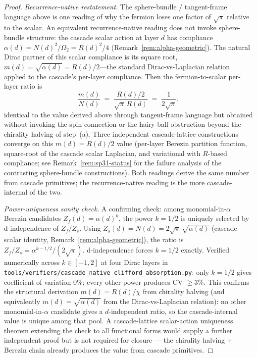 \documentclass[12pt,a4paper]{article}
\begin{document}
\begin{proof}
\medskip
\noindent\emph{Recurrence-native restatement.}
The sphere-bundle / tangent-frame language above is one reading of why the fermion
loses one factor of $\sqrt{\pi}$ relative to the scalar.  An equivalent
recurrence-native reading does not invoke sphere-bundle structure:
the cascade scalar action at layer $d$ has compliance
$\alpha(d) = N(d)^2/\Omega_2 = R(d)^2/4$ (Remark~\ref{rem:alpha-geometric}).  The
natural Dirac partner of this scalar compliance is its square root,
$m(d) = \sqrt{\alpha(d)} = R(d)/2$---the standard Dirac-vs-Laplacian relation
applied to the cascade's per-layer compliance.  Then the fermion-to-scalar
per-layer ratio is
\[
\frac{m(d)}{N(d)} \;=\; \frac{R(d)/2}{\sqrt{\pi}\,R(d)} \;=\; \frac{1}{2\sqrt{\pi}},
\]
identical to the value derived above through tangent-frame language but obtained
without invoking the spin connection or the hairy-ball obstruction beyond the
chirality halving of step~(a).  Three independent cascade-lattice constructions
converge on this $m(d) = R(d)/2$ value (per-layer Berezin partition function,
square-root of the cascade scalar Laplacian, and variational with $R$-based
compliance; see Remark~\ref{rem:sp31-status} for the failure
analysis of the contrasting sphere-bundle constructions).  Both readings derive
the same number from cascade primitives; the recurrence-native reading is the
more cascade-internal of the two.

\medskip
\noindent\emph{Power-uniqueness sanity check.}
A confirming check: among monomial-in-$\alpha$ Berezin candidates
$Z_f(d) = \alpha(d)^k$, the power $k = 1/2$ is uniquely selected by
d-independence of $Z_f/Z_s$.  Using $Z_s(d) = N(d) = 2\sqrt{\pi}\,\sqrt{\alpha(d)}$
(cascade scalar identity, Remark~\ref{rem:alpha-geometric}), the ratio is
$Z_f/Z_s = \alpha^{k-1/2}/(2\sqrt{\pi})$.  d-independence forces $k = 1/2$
exactly.  Verified numerically across $k\in[-1, 2]$ at four Dirac layers in
\texttt{tools/verifiers/cascade\_native\_clifford\_absorption.py}: only $k = 1/2$
gives coefficient of variation $0\%$; every other power produces CV $\geq 3\%$.
This confirms the structural derivation $m(d) = R(d)/\chi$ from chirality
halving (and equivalently $m(d) = \sqrt{\alpha(d)}$ from the
Dirac-vs-Laplacian relation): no other monomial-in-$\alpha$ candidate
gives a $d$-independent ratio, so the cascade-internal value is unique
among that pool.  A cascade-lattice scalar-action uniqueness theorem
extending the check to all functional forms would supply a further
independent proof but is not required for closure --- the chirality
halving + Berezin chain already produces the value from cascade primitives.


\end{proof}
\end{document}
